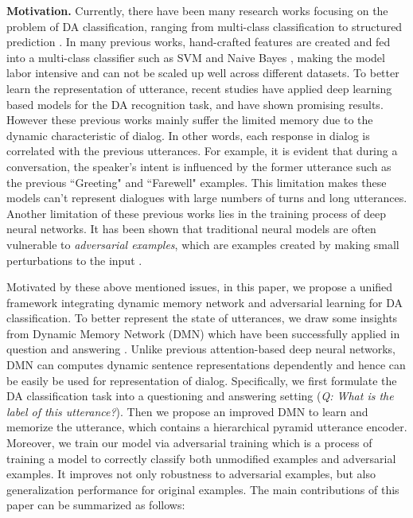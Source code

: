 \documentclass[conference]{IEEEtran}
\begin{document}
	\noindent\textbf{Motivation.} Currently, there have been many research works focusing on the problem of DA classification, ranging from multi-class classification to structured prediction \cite{grau2004dialogue, stolcke2000dialogue}. In many previous works, hand-crafted features are created and fed into a multi-class classifier such as SVM and Naive Bayes \cite{grau2004dialogue,stolcke2000dialogue}, making the model labor intensive and can not be scaled up well across different datasets. 
	To better learn the representation of utterance, recent studies \cite{khanpour2016dialogue,ji2016latent} have applied deep learning based models for the DA recognition task, and have shown promising results.
	However these previous works mainly suffer the limited memory due to the dynamic characteristic of dialog. In other words, each response in dialog is correlated with the previous utterances. 
	For example, it is evident that during a conversation, the speaker's intent is influenced by the former utterance such as the previous ``Greeting" and ``Farewell" examples. This limitation makes these models can't represent dialogues with large numbers of turns and long utterances.
	Another limitation of these previous works lies in the training process of deep neural networks. It has been shown that traditional neural models are often vulnerable to \textit{adversarial examples}, which are examples created by making small perturbations to the input \cite{miyato2016adversarial}.
	
	Motivated by these above mentioned issues, in this paper, we propose a unified framework integrating dynamic memory network and adversarial learning for DA classification. To better represent the state of utterances, we draw some insights from Dynamic Memory Network (DMN) which have been successfully applied in question and answering \cite{xiong2016dynamic}. Unlike previous attention-based deep neural networks, DMN can computes dynamic sentence representations dependently and hence can be easily be used for representation of dialog.
	Specifically, we first formulate the DA classification task into a questioning and answering setting (\textit{Q: What is the label of this utterance?}). Then we propose an improved DMN to learn and memorize the utterance, which contains a hierarchical pyramid utterance encoder. 
	Moreover, we train our model via adversarial training which is a process of training a model to correctly classify both unmodified examples and adversarial examples. It improves not only robustness to adversarial examples, but also generalization performance for original examples.
	The main contributions of this paper can be summarized as follows:
	
\end{document}
